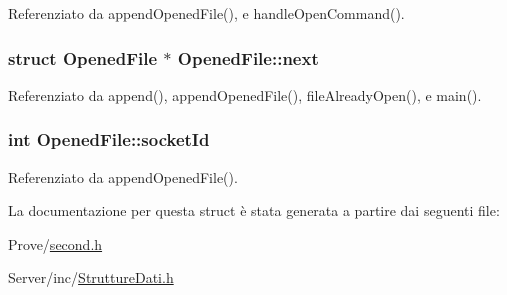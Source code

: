 Referenziato da append\+Opened\+File(), e handle\+Open\+Command().

\hypertarget{structOpenedFile_a9b8c8b995cdda6da249a6ce9a9df98b2}{}
\subsubsection[{next}]{\setlength{\rightskip}{0pt plus 5cm}struct {\bf Opened\+File} $\ast$ Opened\+File\+::next}\label{structOpenedFile_a9b8c8b995cdda6da249a6ce9a9df98b2}


Referenziato da append(), append\+Opened\+File(), file\+Already\+Open(), e main().

\hypertarget{structOpenedFile_a2af35018ecff06dbd349d464c815038a}{}
\subsubsection[{socket\+Id}]{\setlength{\rightskip}{0pt plus 5cm}int Opened\+File\+::socket\+Id}\label{structOpenedFile_a2af35018ecff06dbd349d464c815038a}


Referenziato da append\+Opened\+File().



La documentazione per questa struct è stata generata a partire dai seguenti file\+:\begin{DoxyCompactItemize}
\item 
Prove/\hyperlink{second_8h}{second.\+h}\item 
Server/inc/\hyperlink{StruttureDati_8h}{Strutture\+Dati.\+h}\end{DoxyCompactItemize}
